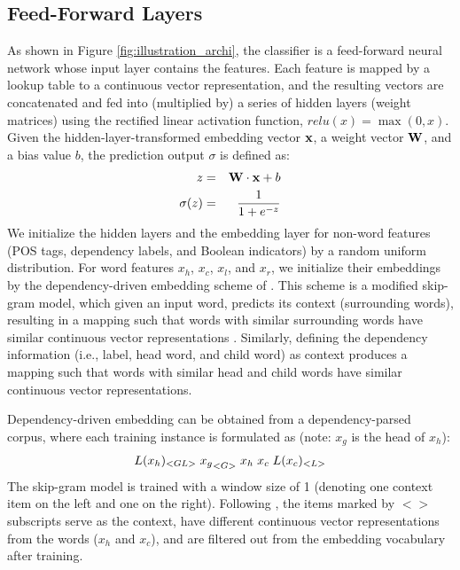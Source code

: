 \documentclass[letterpaper]{article}
\begin{document}
\subsection{Feed-Forward Layers}

As shown in Figure \ref{fig:illustration_archi}, the classifier is a feed-forward neural network whose input layer contains the features. Each feature is mapped by a lookup table to a continuous vector representation, and the resulting vectors are concatenated and fed into (multiplied by) a series of hidden layers (weight matrices) using the rectified linear activation function, $relu(x)=\max(0,x)$. Given the hidden-layer-transformed embedding vector ${\bf x}$, a weight vector ${\bf W}$, and a bias value $b$, the prediction output $\sigma$ is defined as:
\begin{eqnarray}
z &=& {\bf W\cdot{}x}+b \\
\sigma(z) &=& \frac{1}{1+e^{-z}}
\end{eqnarray}
We initialize the hidden layers and the embedding layer for non-word features (POS tags, dependency labels, and Boolean indicators) by a random uniform distribution. For word features $x_h$, $x_c$, $x_l$, and $x_r$, we initialize their embeddings by the dependency-driven embedding scheme of \cite{bansal_tailoring_2014}. This scheme is a modified skip-gram model, which given an input word, predicts its context (surrounding words), resulting in a mapping such that words with similar surrounding words have similar continuous vector representations \cite{mikolov_efficient_2013}. Similarly, defining the dependency information (i.e., label, head word, and child word) as context produces a mapping such that words with similar head and child words have similar continuous vector representations.

Dependency-driven embedding can be obtained from a dependency-parsed corpus, where each training instance is formulated as (note: $x_g$ is the head of $x_h$):
\[
L(x_{h})_{<GL>}\hspace{0.1cm}{{x}_{g}}_{<G>}\hspace{0.1cm}x_h\hspace{0.1cm}x_c\hspace{0.1cm}L(x_c)_{<L>}
\]
The skip-gram model is trained with a window size of 1 (denoting one context item on the left and one on the right). Following \cite{bansal_tailoring_2014}, the items marked by $<>$ subscripts serve as the context, have different continuous vector representations from the words ($x_h$ and $x_c$), and are filtered out from the embedding vocabulary after training.
\end{document}
